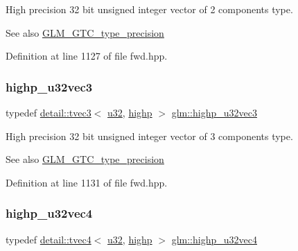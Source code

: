 High precision 32 bit unsigned integer vector of 2 components type. \begin{DoxySeeAlso}{See also}
\hyperlink{group__gtc__type__precision}{G\+L\+M\+\_\+\+G\+T\+C\+\_\+type\+\_\+precision} 
\end{DoxySeeAlso}


Definition at line 1127 of file fwd.\+hpp.

\mbox{\label{group__gtc__type__precision_gab1e386f5e415e00f800edf5d15207286}} 
\subsubsection{\texorpdfstring{highp\+\_\+u32vec3}{highp\_u32vec3}}
{\footnotesize\ttfamily typedef \hyperlink{structglm_1_1detail_1_1tvec3}{detail\+::tvec3}$<$ \hyperlink{group__gtc__type__precision_ga54e837745059fd29017bed71cfa0a8db}{u32}, \hyperlink{namespaceglm_a0f04f086094c747d227af4425893f545ac6f7eab42eacbb10d59a58e95e362074}{highp} $>$ \hyperlink{group__gtc__type__precision_gab1e386f5e415e00f800edf5d15207286}{glm\+::highp\+\_\+u32vec3}}

High precision 32 bit unsigned integer vector of 3 components type. \begin{DoxySeeAlso}{See also}
\hyperlink{group__gtc__type__precision}{G\+L\+M\+\_\+\+G\+T\+C\+\_\+type\+\_\+precision} 
\end{DoxySeeAlso}


Definition at line 1131 of file fwd.\+hpp.

\mbox{\label{group__gtc__type__precision_ga9418a8d549d344d4f7b7158771a2fdfe}} 
\subsubsection{\texorpdfstring{highp\+\_\+u32vec4}{highp\_u32vec4}}
{\footnotesize\ttfamily typedef \hyperlink{structglm_1_1detail_1_1tvec4}{detail\+::tvec4}$<$ \hyperlink{group__gtc__type__precision_ga54e837745059fd29017bed71cfa0a8db}{u32}, \hyperlink{namespaceglm_a0f04f086094c747d227af4425893f545ac6f7eab42eacbb10d59a58e95e362074}{highp} $>$ \hyperlink{group__gtc__type__precision_ga9418a8d549d344d4f7b7158771a2fdfe}{glm\+::highp\+\_\+u32vec4}}

